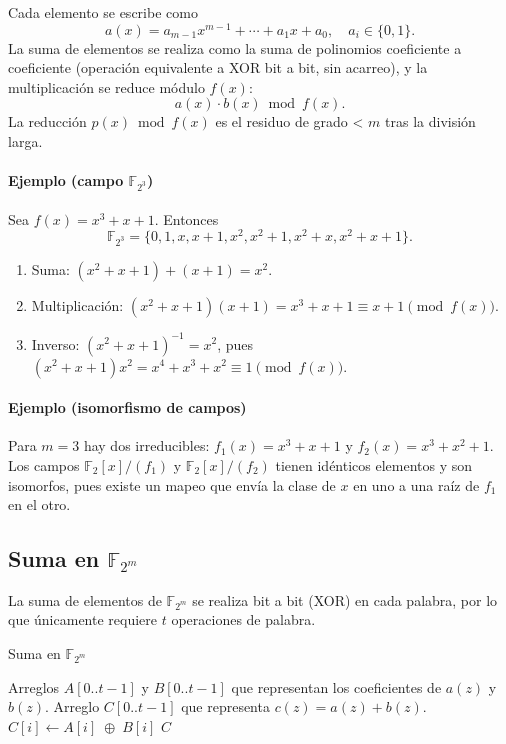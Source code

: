 Cada elemento se escribe como
\[
  a(x)=a_{m-1}x^{m-1}+\cdots+a_1x+a_0,\quad a_i\in\{0,1\}.
\]
La suma de elementos se realiza como la suma de polinomios coeficiente a coeficiente (operación equivalente a XOR bit a bit, sin acarreo), y la multiplicación se reduce módulo $f(x)$:
\[
  a(x)\cdot b(x)\bmod f(x).
\]
La reducción $p(x)\bmod f(x)$ es el residuo de grado < $m$ tras la división larga.

\paragraph{Ejemplo (campo $\mathbb{F}_{2^3}$)}
Sea $f(x)=x^3+x+1$. Entonces
\[
  \mathbb{F}_{2^3}=\{0,1,x,x+1,x^2,x^2+1,x^2+x,x^2+x+1\}.
\]
\begin{enumerate}
  \item Suma: $(x^2+x+1)+(x+1)=x^2$.
  \item Multiplicación: $(x^2+x+1)(x+1)=x^3+x+1\equiv x+1\pmod{f(x)}$.
  \item Inverso: $(x^2+x+1)^{-1}=x^2$, pues $(x^2+x+1)x^2=x^4+x^3+x^2\equiv1\pmod{f(x)}$.
\end{enumerate}

\paragraph{Ejemplo (isomorfismo de campos)}
Para $m=3$ hay dos irreducibles: $f_1(x)=x^3+x+1$ y $f_2(x)=x^3+x^2+1$. Los campos $\mathbb{F}_2[x]/(f_1)$ y $\mathbb{F}_2[x]/(f_2)$ tienen idénticos elementos y son isomorfos, pues existe un mapeo que envía la clase de $x$ en uno a una raíz de $f_1$ en el otro.

\subsection{Suma en \texorpdfstring{$\mathbb{F}_{2^m}$}{F2m}}
La suma de elementos de \(\mathbb{F}_{2^m}\) se realiza bit a bit (XOR) en cada palabra, por lo que únicamente requiere \(t\) operaciones de palabra.

\begin{algorithm}
\caption{Suma en \(\mathbb{F}_{2^m}\)}
\label{alg:add_f2m}
\begin{algorithmic}[1]
\REQUIRE Arreglos \(A[0..t-1]\) y \(B[0..t-1]\) que representan los coeficientes de \(a(z)\) y \(b(z)\).
\ENSURE Arreglo \(C[0..t-1]\) que representa \(c(z)=a(z)+b(z)\).
  \STATE \(C[i] \leftarrow A[i]\;\oplus\;B[i]\)
\ENDFOR
\RETURN \(C\)
\end{algorithmic}
\end{algorithm}

